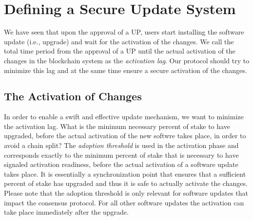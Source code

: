 \section{Defining a Secure Update System} \label{secureupdate}
We have seen that upon the approval of a UP, users start installing the software update (i.e., upgrade) and wait for the activation of the changes. We call the total  time period from the approval of a UP until the actual activation of the changes in the blockchain system as the \emph{activation lag}. Our protocol should try to minimize this lag and at the same time ensure a secure activation of the changes.


\subsection{The Activation of Changes}\label{se:informal}
In order to enable a swift and effective update mechanism, we want to minimize the activation lag. What is the minimum necessary percent of stake to have upgraded, before the actual activation of the new softwre takes place, in order to avoid a chain split? The \emph{adoption threshold} is used in the activation phase and corresponds exactly to the minimum percent of stake that is necessary to have signaled activation readiness, before the actual activation of a software update takes place. It is essentially a synchronization point that ensures that a sufficient percent of stake has upgraded and thus it is safe to actually activate the changes. 
 Please note that the adoption threshold is only relevant for software updates that impact the consensus protocol. For all other software updates the activation can take place immediately after the upgrade.

